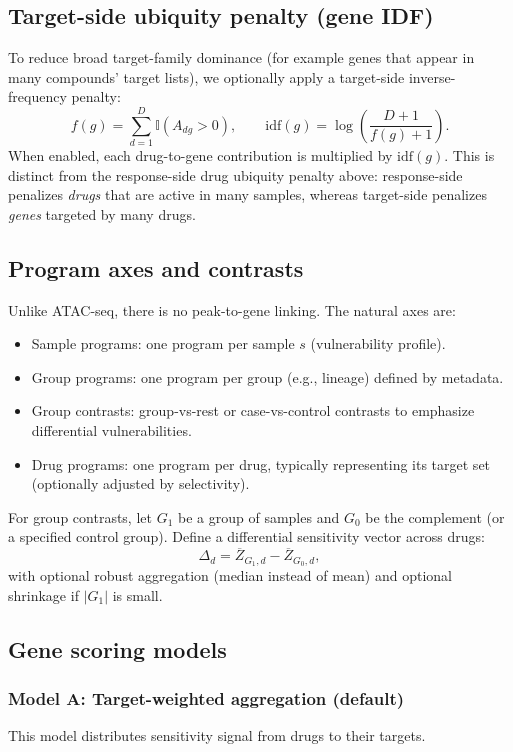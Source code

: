 \documentclass[11pt]{article}
\begin{document}
\subsection{Target-side ubiquity penalty (gene IDF)}
To reduce broad target-family dominance (for example genes that appear in many compounds' target lists), we optionally apply a target-side inverse-frequency penalty:
\begin{equation}
f(g) = \sum_{d=1}^{D} \mathbb{I}(A_{dg} > 0), \qquad
\mathrm{idf}(g) = \log\left(\frac{D+1}{f(g)+1}\right).
\end{equation}
When enabled, each drug-to-gene contribution is multiplied by $\mathrm{idf}(g)$.
This is distinct from the response-side drug ubiquity penalty above: response-side penalizes \emph{drugs} that are active in many samples, whereas target-side penalizes \emph{genes} targeted by many drugs.

\subsection{Program axes and contrasts}
Unlike ATAC-seq, there is no peak-to-gene linking. The natural axes are:
\begin{itemize}
  \item Sample programs: one program per sample $s$ (vulnerability profile).
  \item Group programs: one program per group (e.g., lineage) defined by metadata.
  \item Group contrasts: group-vs-rest or case-vs-control contrasts to emphasize differential vulnerabilities.
  \item Drug programs: one program per drug, typically representing its target set (optionally adjusted by selectivity).
\end{itemize}

For group contrasts, let $G_1$ be a group of samples and $G_0$ be the complement (or a specified control group). Define a differential sensitivity vector across drugs:
\begin{equation}
\Delta_d = \overline{Z}_{G_1,d} - \overline{Z}_{G_0,d},
\end{equation}
with optional robust aggregation (median instead of mean) and optional shrinkage if $|G_1|$ is small.

\subsection{Gene scoring models}
\subsubsection{Model A: Target-weighted aggregation (default)}
This model distributes sensitivity signal from drugs to their targets.
\end{document}
